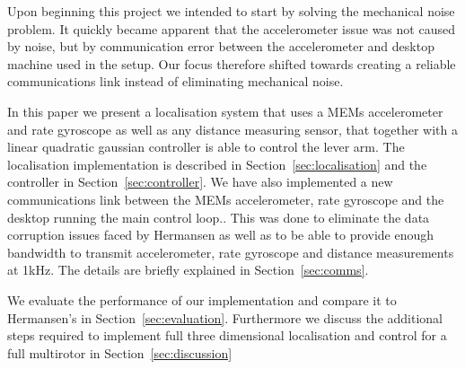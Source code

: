 Upon beginning this project we intended to start by solving the mechanical noise problem. It quickly became apparent that the 
accelerometer issue was not caused by noise, but by communication error between the accelerometer and desktop machine used in the setup.
Our focus therefore shifted towards creating a reliable communications link instead of eliminating mechanical noise.

In this paper we present a localisation system that uses a MEMs accelerometer and rate gyroscope as well as any distance measuring sensor,
that together with a linear quadratic gaussian controller is able to control the lever arm. The localisation implementation is described
in Section~\ref{sec:localisation} and the controller in Section~\ref{sec:controller}.
We have also implemented a new communications 
link between the MEMs accelerometer, rate gyroscope and the desktop running the main control loop.. This was done to eliminate the data corruption 
issues faced by Hermansen as well as to be able to provide enough bandwidth to transmit accelerometer, rate gyroscope and distance 
measurements at 1kHz. The details are briefly explained in Section~\ref{sec:comms}. 

We evaluate the performance of our implementation and compare it to Hermansen's in Section~\ref{sec:evaluation}. Furthermore we 
discuss the additional steps required to implement full three dimensional localisation and control for a full multirotor in Section~\ref{sec:discussion}

